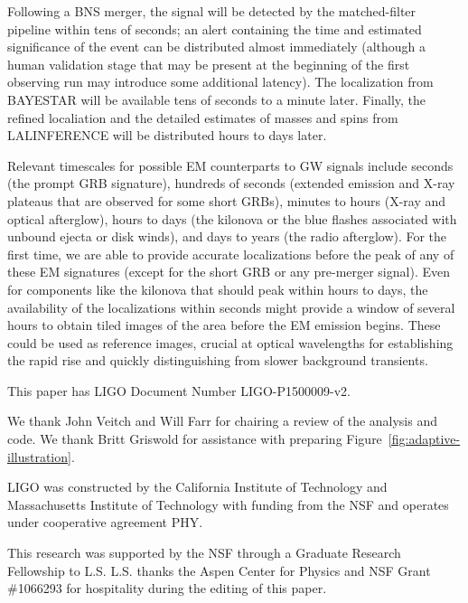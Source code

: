 \documentclass[amsmath,amssymb,aps,prx,reprint,nopreprintnumbers,nofootinbib]{revtex4-1}
\begin{document}
Following a \ac{BNS} merger, the signal will be detected by the matched\nobreakdashes-filter pipeline within tens of seconds; an alert containing the time and estimated significance of the event can be distributed almost immediately (although a human validation stage that may be present at the beginning of the first observing run may introduce some additional latency). The localization from \ac{BAYESTAR} will be available tens of seconds to a minute later. Finally, the refined localiation and the detailed estimates of masses and spins from LALINFERENCE will be distributed hours to days later.

Relevant timescales for possible \ac{EM} counterparts to \ac{GW} signals include seconds (the prompt \ac{GRB} signature), hundreds of seconds (extended emission and X\nobreakdashes-ray plateaus that are observed for some short \acp{GRB}), minutes to hours (X\nobreakdashes-ray and optical afterglow), hours to days (the kilonova or the blue flashes associated with unbound ejecta or disk winds), and days to years (the radio afterglow). For the first time, we are able to provide accurate localizations before the peak of any of these \ac{EM} signatures (except for the short \ac{GRB} or any pre\nobreakdashes-merger signal). Even for components like the kilonova that should peak within hours to days, the availability of the localizations within seconds might provide a window of several hours to obtain tiled images of the area before the \ac{EM} emission begins. These could be used as reference images, crucial at optical wavelengths for establishing the rapid rise and quickly distinguishing from slower background transients.



\begin{acknowledgements}
This paper has LIGO Document Number LIGO\nobreakdashes-P1500009\nobreakdashes-v2.

We thank John Veitch and Will Farr for chairing a review of the analysis and code. We thank Britt Griswold for assistance with preparing Figure~\ref{fig:adaptive-illustration}.
\end{acknowledgements}

LIGO was constructed by the California Institute of Technology and Massachusetts Institute of Technology with funding from the \ac{NSF} and operates under cooperative agreement PHY.

This research was supported by the \ac{NSF} through a Graduate Research Fellowship to L.S. L.S. thanks the Aspen Center for Physics and \ac{NSF} Grant \#1066293 for hospitality during the editing of this paper.
\end{document}

